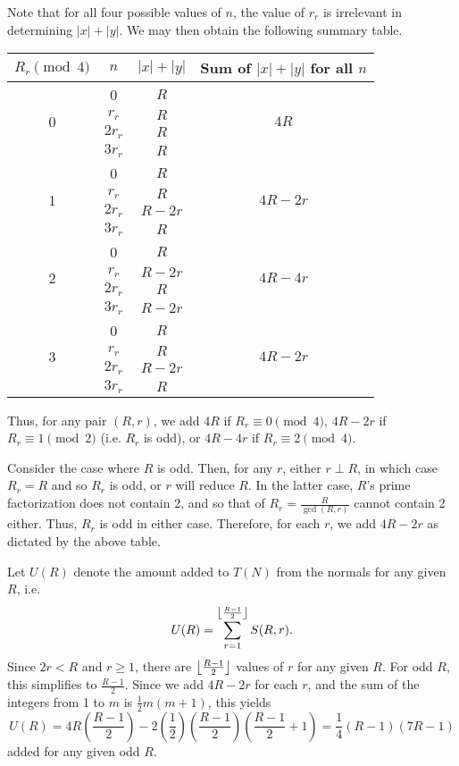 \documentclass[12pt]{article}
\DeclarePairedDelimiter\floor{\lfloor}{\rfloor}
\begin{document}
Note that for all four possible values of $n$, the value of $r_r$ is irrelevant in determining $|x| + |y|$. We may then obtain the following summary table.

\begin{center}
\begin{tabular}{c|c|c|c}
  $R_r \pmod 4$ & $n$ & $|x| + |y|$ & Sum of $|x| + |y|$ for all $n$ \\ \hline
  \multirow{4}{*}{0} & 0 & $R$ & \multirow{4}{*}{$4R$} \\
  & $r_r$ & $R$ & \\
  & $2r_r$ & $R$ & \\
  & $3r_r$ & $R$ & \\ \hline
  \multirow{4}{*}{1} & 0 & $R$ & \multirow{4}{*}{$4R - 2r$} \\
  & $r_r$ & $R$ & \\
  & $2r_r$ & $R - 2r$ & \\
  & $3r_r$ & $R$ & \\ \hline
  \multirow{4}{*}{2} & 0 & $R$ & \multirow{4}{*}{$4R - 4r$} \\
  & $r_r$ & $R - 2r$ & \\
  & $2r_r$ & $R$ & \\
  & $3r_r$ & $R - 2r$ & \\ \hline
  \multirow{4}{*}{3} & 0 & $R$ & \multirow{4}{*}{$4R - 2r$} \\
  & $r_r$ & $R$ & \\
  & $2r_r$ & $R - 2r$ & \\
  & $3r_r$ & $R$ & \\
\end{tabular}
\end{center}

Thus, for any pair $(R, r)$, we add $4R$ if $R_r \equiv 0 \pmod 4$, $4R - 2r$ if $R_r \equiv 1 \pmod 2$ (i.e. $R_r$ is odd), or $4R - 4r$ if $R_r \equiv 2 \pmod 4$.

Consider the case where $R$ is odd. Then, for any $r$, either $r \perp R$, in which case $R_r = R$ and so $R_r$ is odd, or $r$ will reduce $R$. In the latter case, $R$'s prime factorization does not contain 2, and so that of $R_r = \frac{R}{\gcd(R, r)}$ cannot contain 2 either. Thus, $R_r$ is odd in either case. Therefore, for each $r$, we add $4R - 2r$ as dictated by the above table.

Let $U(R)$ denote the amount added to $T(N)$ from the normals for any given $R$, i.e. \[ U(R) = \sum_{r=1}^{\floor*{\frac{R-1}{2}}} S(R, r). \] Since $2r < R$ and $r \ge 1$, there are $\floor*{\frac{R - 1}{2}}$ values of $r$ for any given $R$. For odd $R$, this simplifies to $\frac{R-1}{2}$. Since we add $4R - 2r$ for each $r$, and the sum of the integers from 1 to $m$ is $\frac{1}{2}m(m+1)$, this yields
\begin{equation}
  U(R) = 4R\left( \frac{R-1}{2} \right) - 2\left( \frac{1}{2} \right)\left( \frac{R-1}{2} \right) \left( \frac{R-1}{2} + 1 \right) = \frac{1}{4} (R-1)(7R-1) \label{oddnormals}
\end{equation}
added for any given odd $R$.
\end{document}
